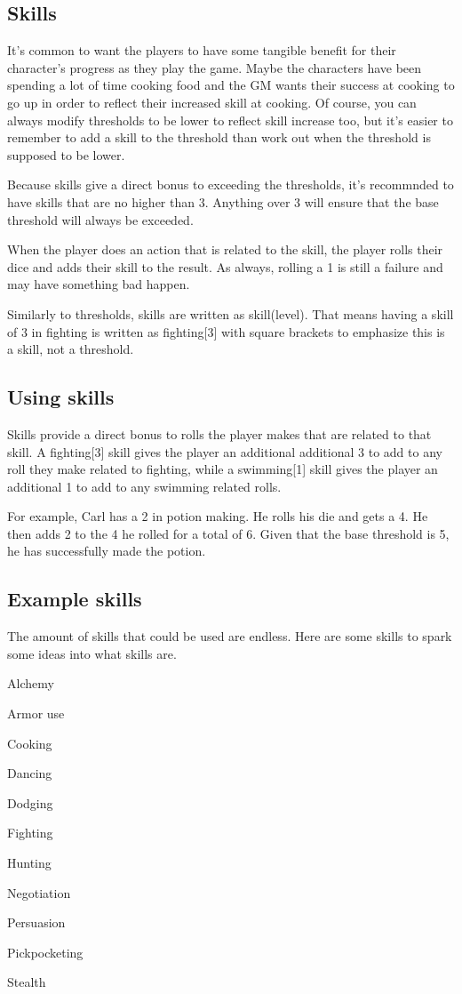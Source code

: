 \begin{flushleft}

\chapter{Skills} \label{Skills}

It's common to want the players to have some tangible benefit for their
character's progress as they play the game. Maybe the characters have been
spending a lot of time cooking food and the GM wants their success at cooking
to go up in order to reflect their increased skill at cooking. Of course, you
can always modify thresholds to be lower to reflect skill increase too, but
it's easier to remember to add a skill to the threshold than work out when the
threshold is supposed to be lower.

Because skills give a direct bonus to exceeding the thresholds, it's recommnded
to have skills that are no higher than 3. Anything over 3 will ensure that
the base threshold will always be exceeded.

When the player does an action that is related to the skill, the player rolls
their dice and adds their skill to the result. As always, rolling a 1 is still
a failure and may have something bad happen.

Similarly to thresholds, skills are written as skill(level). That means having
a skill of 3 in fighting is written as fighting[3] with square brackets to
emphasize this is a skill, not a threshold.

\section*{Using skills} \label{using_skills}

Skills provide a direct bonus to rolls the player makes that are related to
that skill. A fighting[3] skill gives the player an additional additional
3 to add to any roll they make related to fighting, while a swimming[1] skill
gives the player an additional 1 to add to any swimming related rolls.

For example, Carl has a 2 in potion making. He rolls his die and gets a 4. He
then adds 2 to the 4 he rolled for a total of 6. Given that the base threshold
is 5, he has successfully made the potion.

\section*{Example skills} \label{example_skills}

The amount of skills that could be used are endless. Here are some skills to
spark some ideas into what skills are.

Alchemy

Armor use

Cooking

Dancing

Dodging

Fighting

Hunting

Negotiation

Persuasion

Pickpocketing

Stealth


\end{flushleft}
